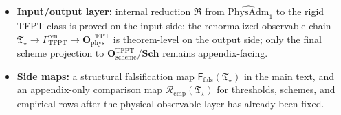 \documentclass[11pt,a4paper]{article}
\theoremstyle{definition}
\theoremstyle{remark}
\newcommand{\Tstar}{\mathfrak T_{\star}}
\newcommand{\Ffals}{\mathsf F_{\mathrm{fals}}}
\newcommand{\Rcmp}{\mathcal R_{\mathrm{cmp}}}
\newcommand{\PhysAdmOne}{\widehat{\mathrm{PhysAdm}}_1}
\newcommand{\GrenTFPT}{\Gamma_{\mathrm{TFPT}}^{\mathrm{ren}}}
\newcommand{\OphysTFPT}{\mathbf O_{\mathrm{phys}}^{\mathrm{TFPT}}}
\newcommand{\OschemeTFPT}{\mathbf O_{\mathrm{scheme}}^{\mathrm{TFPT}}}
\newcommand{\SchGrp}{\mathbf{Sch}}
\newcommand{\Runiv}{\mathfrak R}
\begin{document}
\begin{tcolorbox}[colback=tfptblue!2, colframe=tfptblue!40, breakable,
    title={Closed theorem surface}, colbacktitle=tfptblue!60]
\begin{itemize}[leftmargin=1.5em, topsep=3pt, itemsep=3pt]
    essential injectivity on the rigid image, and the canonical rigid object $\Tstar$.
    \item \textbf{Input/output layer:} internal reduction $\Runiv$ from $\PhysAdmOne$ to the rigid TFPT class is proved on the input side; the renormalized observable chain $\Tstar\to\GrenTFPT\to\OphysTFPT$ is theorem-level on the output side; only the final scheme projection to $\OschemeTFPT/\SchGrp$ remains appendix-facing.
    \item \textbf{Side maps:} a structural falsification map $\Ffals(\Tstar)$ in the main text, and an appendix-only comparison map $\Rcmp(\Tstar)$ for thresholds, schemes, and empirical rows after the physical observable layer has already been fixed.
\end{itemize}
\end{tcolorbox}
\end{document}
